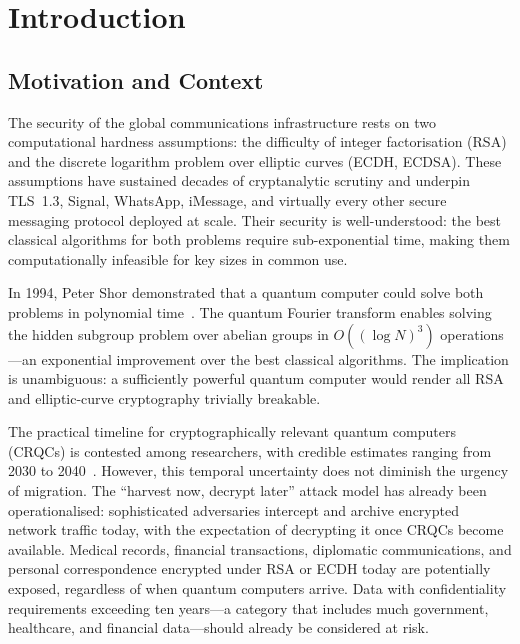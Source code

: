 \documentclass[12pt,a4paper]{report}
\begin{document}
\newpage
\tableofcontents
\newpage
\listoftables
\newpage
\listoffigures
\newpage

\chapter{Introduction}

\section{Motivation and Context}

The security of the global communications infrastructure rests on two computational
hardness assumptions: the difficulty of integer factorisation (RSA) and the discrete
logarithm problem over elliptic curves (ECDH, ECDSA). These assumptions have sustained
decades of cryptanalytic scrutiny and underpin TLS~1.3, Signal, WhatsApp, iMessage,
and virtually every other secure messaging protocol deployed at scale. Their security
is well-understood: the best classical algorithms for both problems require
sub-exponential time, making them computationally infeasible for key sizes in common
use.

In 1994, Peter Shor demonstrated that a quantum computer could solve both problems in
polynomial time~\cite{shor1994}. The quantum Fourier transform enables solving the
hidden subgroup problem over abelian groups in $O((\log N)^3)$ operations---an
exponential improvement over the best classical algorithms. The implication is
unambiguous: a sufficiently powerful quantum computer would render all RSA and
elliptic-curve cryptography trivially breakable.

The practical timeline for cryptographically relevant quantum computers (CRQCs) is
contested among researchers, with credible estimates ranging from 2030 to
2040~\cite{nist2024}. However, this temporal uncertainty does not diminish the urgency
of migration. The ``harvest now, decrypt later'' attack model has already been
operationalised: sophisticated adversaries intercept and archive encrypted network
traffic today, with the expectation of decrypting it once CRQCs become available.
Medical records, financial transactions, diplomatic communications, and personal
correspondence encrypted under RSA or ECDH today are potentially exposed, regardless
of when quantum computers arrive. Data with confidentiality requirements exceeding ten
years---a category that includes much government, healthcare, and financial
data---should already be considered at risk.
\end{document}
